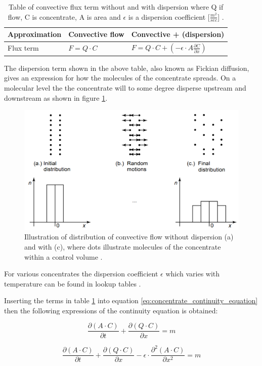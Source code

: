 \begin{table}[H]
\centering
	\begin{tabular}{|l|l|l|} \hline
	Approximation 	& Convective flow &	Convective + (dispersion)  \\ \hline
	Flux term   	& $F = Q \cdot C$ & $ F = Q \cdot C + \left(- \epsilon \cdot A \frac{\partial C}{\partial x} \right)$  \\ \hline
  	\end{tabular} 
\caption{Table of convective flux term without and with dispersion where Q if flow, C is concentrate, A is area and $\epsilon$ is a dispersion coefficient [$\frac{m^2}{sec}$] .}
\label{tab:flux_terms} 
\end{table}

The dispersion term shown in the above table, also known as Fickian diffusion, gives an expression for how the molecules of the concentrate spreads. On a molecular level the the concentrate will to some degree disperse upstream and downstream as shown in figure \ref{fig:diffusion_example}. 

\begin{figure}[H]
\centering
\includegraphics[width=.75\textwidth]{report/modeling/pictures/diffusion_example.png}
\caption{Illustration of distribution of convective flow without dispersion (a) and with (c), where dots illustrate molecules of the concentrate within a control volume \cite{karlruhe_con_def_dif_equation}.}
\label{fig:diffusion_example}
\end{figure} 

For various concentrates the dispersion coefficient $\epsilon$ which varies with temperature can be found in lookup tables \cite{karlruhe_con_def_dif_equation}.

Inserting the terms in table \ref{tab:flux_terms} into equation \ref{eq:concentrate_continuity_equation} then the following expressions of the continuity equation is obtained:

\begin{equation}
	\frac{\partial (A\cdot C)}{\partial t} + \frac{\partial (Q \cdot C)}{\partial x} = m 
\label{eq:concentrate_continuity_equation_convective}
\end{equation}

\begin{equation}
	\frac{\partial (A\cdot C)}{\partial t} + \frac{\partial (Q \cdot C)}{\partial x} - \epsilon \cdot \frac{\partial^2 (A \cdot C)}{\partial x^2} = m 
\label{eq:concentrate_continuity_equation_dispersion}
\end{equation}

